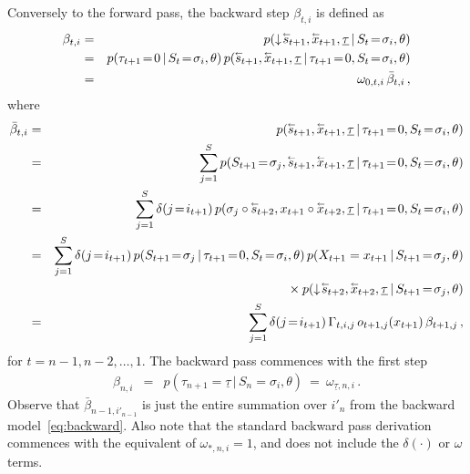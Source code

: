 \documentclass[a4paper]{article}
\newcommand{\rvec}[1]{\accentset{\leftarrow}{#1}}
\newcommand{\dn}{\downarrow\!}
\begin{document}
Conversely to the forward pass, the backward step $\beta_{t,i}$ is defined as
\begin{eqnarray}
   \beta_{t,i} & = & p(\dn\rvec{s}_{t+1},\rvec{x}_{t+1},\underline{\tau}\,|\,S_t\!=\!\sigma_{i},\theta) 
\nonumber\\& = &
  p(\tau_{t+1}\!=\!0\,|\,S_t\!=\!\sigma_i,\theta)\,p(\rvec{s}_{t+1},\rvec{x}_{t+1},\underline{\tau}\,|\,\tau_{t+1}\!=\!0,S_t\!=\!\sigma_{i},\theta) 
\nonumber\\& = &
  \omega_{0,t,i}\,\bar{\beta}_{t,i}\,,
\label{eq:beta}
\end{eqnarray}
where
\begin{eqnarray}
   \bar{\beta}_{t,i} & = & p(\rvec{s}_{t+1},\rvec{x}_{t+1},\underline{\tau}\,|\,\tau_{t+1}\!=\!0,S_t\!=\!\sigma_{i},\theta) 
\nonumber\\& = &
  \sum_{j=1}^{S} p(S_{t+1}\!=\!\sigma_j,\rvec{s}_{t+1},\rvec{x}_{t+1},\underline{\tau}\,|\,\tau_{t+1}\!=\!0,S_t\!=\!\sigma_{i},\theta) 
\nonumber\\& = &
  \sum_{j=1}^{S}\delta(j\!=\!i_{t+1})\, p(\sigma_j\circ\rvec{s}_{t+2},x_{t+1}\circ\rvec{x}_{t+2},\underline{\tau}\,|\,\tau_{t+1}\!=\!0,S_t\!=\!\sigma_{i},\theta) 
\nonumber\\& = & 
   \sum_{j=1}^{S}\delta(j\!=\!i_{t+1})\, p(S_{t+1}\!=\!\sigma_j\,|\,\tau_{t+1}\!=\!0,S_t\!=\!\sigma_i,\theta)
\,p(X_{t+1}=x_{t+1}\,|\,S_{t+1}\!=\!\sigma_j,\theta)
\nonumber\\&&\hspace*{5mm}{}\times
p(\dn\rvec{s}_{t+2},\rvec{x}_{t+2},\underline{\tau}\,|\,S_{t+1}\!=\!\sigma_{j},\theta) 
\nonumber\\& = & 
	\sum_{j=1}^{S}\delta(j\!=\!i_{t+1})\,\Gamma_{t,i,j}\,o_{t+1,j}(x_{t+1})\,\beta_{t+1,j}
\,,
\end{eqnarray}
for $t=n-1,n-2,\ldots,1$. The backward pass commences with the first step
\begin{eqnarray}
   \beta_{n,i} & = & p(\tau_{n+1}\!=\!\underline{\tau}\,|\,S_n\!=\!\sigma_i,\theta)
~=~\omega_{\underline{\tau},n,i}\,.
\end{eqnarray}
Observe that $\bar{\beta}_{n-1,i'_{n-1}}$ is just
the entire summation over $i'_n$ from the backward model~\eqref{eq:backward}.
Also note that the standard backward pass derivation commences with the equivalent of $\omega_{*,n,i}=1$,
and does not include the $\delta(\cdot)$ or $\omega$ terms.
\end{document}
